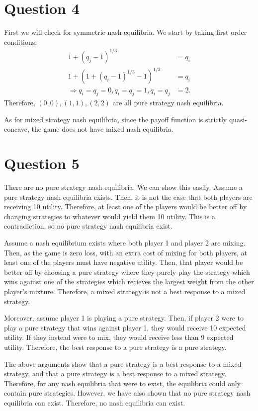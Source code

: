 \documentclass[11pt]{article} %
\begin{document}
\section{Question 4}
First we will check for symmetric nash equilibria. We start by taking first order conditions:
\begin{align*}
1+(q_j - 1)^{1/3} &= q_i\\
1+(1+(q_i - 1)^{1/3} - 1)^{1/3} &= q_i\\
\Rightarrow q_i = q_j = 0, q_i = q_j = 1, q_i = q_j &= 2.
\end{align*}
Therefore, $(0,0),(1,1),(2,2)$ are all pure strategy nash equilibria.

As for mixed strategy nash equilibria, since the payoff function is strictly quasi-concave, the game does not have mixed nash equilibria.

\section{Question 5}

There are no pure strategy nash equilibria. We can show this easily. Assume a pure strategy nash equilibria exists. Then, it is not the case that both players are receiving 10 utility. Therefore, at least one of the players would be better off by changing strategies to whatever would yield them 10 utility. This is a contradiction, so no pure strategy nash equilibria exist.

Assume a nash equilibrium exists where both player 1 and player 2 are mixing. Then, as the game is zero loss, with an extra cost of mixing for both players, at least one of the players must have negative utility. Then, that player would be better off by choosing a pure strategy where they purely play the strategy which wins against one of the strategies which recieves the largest weight from the other player's mixture. Therefore, a mixed strategy is not a best response to a mixed strategy.

Moreover, assume player 1 is playing a pure strategy. Then, if player 2 were to play a pure strategy that wins against player 1, they would receive 10 expected utility. If they instead were to mix, they would receive less than 9 expected utility. Therefore, the best response to a pure strategy is a pure strategy.

The above arguments show that a pure strategy is a best response to a mixed strategy, and that a pure strategy is a best response to a mixed strategy. Therefore, for any nash equilibria that were to exist, the equilibria could only contain pure strategies. However, we have also shown that no pure strategy nash equilibria can exist. Therefore, no nash equilibria can exist.
\end{document}
